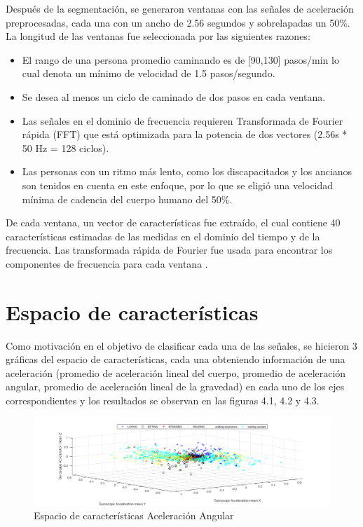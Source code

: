 \documentclass[11pt]{report}
\begin{document}
\par
\medskip
\noindent
Después de la segmentación, se generaron ventanas con las señales de aceleración preprocesadas, cada una con un ancho de 2.56 segundos y sobrelapadas un 50\%. La longitud de las ventanas fue seleccionada por las siguientes razones:
 
\begin{itemize}
\item El rango de una persona promedio caminando es de [90,130] pasos/min lo cual denota un mínimo de velocidad de 1.5 pasos/segundo.
\item Se desea al menos un ciclo de caminado de dos pasos en cada ventana.
\item Las señales en el dominio de frecuencia requieren Transformada de Fourier rápida (FFT) que está optimizada para la potencia de dos vectores (2.56s * 50 Hz = 128 ciclos).
\item Las personas con un ritmo más lento, como los discapacitados y los ancianos son tenidos en cuenta en este enfoque, por lo que se  eligió una velocidad mínima de cadencia del cuerpo humano del 50\%.
\end{itemize}

\par
\medskip
\noindent
De cada ventana, un vector de características fue extraído, el cual contiene 40 características estimadas de las medidas en el dominio del tiempo y de la frecuencia. Las transformada rápida de Fourier fue usada para encontrar los componentes de frecuencia para cada ventana \cite{Anguita}. 

\section{Espacio de características}

Como motivación en el objetivo de clasificar cada una de las señales, se hicieron 3 gráficas del espacio de características, cada una obteniendo información de una aceleración (promedio de aceleración lineal del cuerpo, promedio de aceleración angular, promedio de aceleración lineal de la gravedad) en cada uno de los ejes correspondientes y los resultados se observan en las figuras  4.1, 4.2 y 4.3.

\begin{figure}[H]
  \centering
    \includegraphics[width=1.2\textwidth]{aceleracion_angular}
   \caption{Espacio de características Aceleración Angular}
\end{figure}
\end{document}
